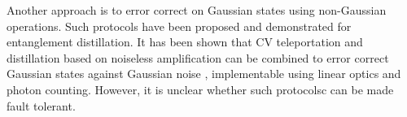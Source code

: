 Another approach is to error correct on Gaussian states using non-Gaussian operations. Such protocols have been proposed \cite{bib:PhysRevA.67.062320} and demonstrated \cite{bib:xiang2010heralded} for entanglement distillation. It has been shown that CV teleportation and distillation based on noiseless amplification can be combined to error correct Gaussian states against Gaussian noise \cite{bib:PhysRevA.84.022339}, implementable using linear optics and photon counting.
However, it is unclear whether such protocolsc can be made fault tolerant.

